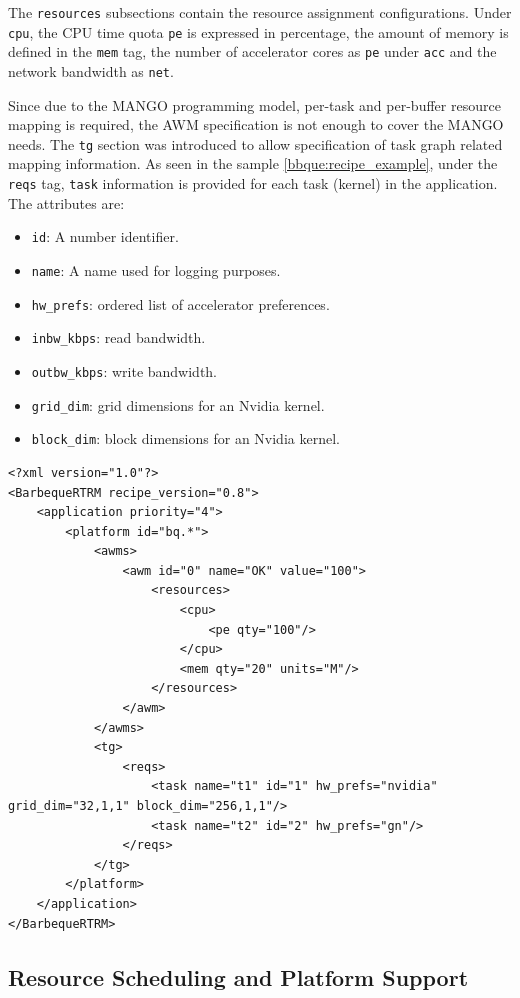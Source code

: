The \texttt{resources} subsections contain the resource assignment configurations. Under \texttt{cpu}, the CPU time quota \texttt{pe} is expressed in percentage, the amount of memory is defined in the \texttt{mem} tag, the number of accelerator cores as \texttt{pe} under \texttt{acc} and the network bandwidth as \texttt{net}.

Since due to the MANGO programming model, per-task and per-buffer resource mapping is required, the AWM specification is not enough to cover the MANGO needs. The \texttt{tg} section was introduced to allow specification of task graph related mapping information.
As seen in the sample \ref{bbque:recipe_example}, under the \texttt{reqs} tag, \texttt{task} information is provided for each task (kernel) in the application. The attributes are:

\begin{itemize}
    \item \texttt{id}: A number identifier.
    \item \texttt{name}: A name used for logging purposes.
    \item \texttt{hw\_prefs}: ordered list of accelerator preferences.
    \item \texttt{inbw\_kbps}: read bandwidth.
    \item \texttt{outbw\_kbps}: write bandwidth.
    \item \texttt{grid\_dim}: grid dimensions for an Nvidia kernel.
    \item \texttt{block\_dim}: block dimensions for an Nvidia kernel.
\end{itemize}

\begin{lstlisting}[style=CStyle, label=bbque:recipe_example, caption=BarbecueRTRM Recipe file - Saxpy Sample in GN and Nvidia]
<?xml version="1.0"?>
<BarbequeRTRM recipe_version="0.8">
	<application priority="4">
		<platform id="bq.*">
			<awms>
				<awm id="0" name="OK" value="100">
					<resources>
						<cpu>
							<pe qty="100"/>
						</cpu>
						<mem qty="20" units="M"/>
					</resources>
				</awm>
			</awms>
			<tg>
				<reqs>
					<task name="t1" id="1" hw_prefs="nvidia" grid_dim="32,1,1" block_dim="256,1,1"/>
					<task name="t2" id="2" hw_prefs="gn"/>
				</reqs>
			</tg>
		</platform>
	</application>
</BarbequeRTRM>
\end{lstlisting}

\subsection{Resource Scheduling and Platform Support}

